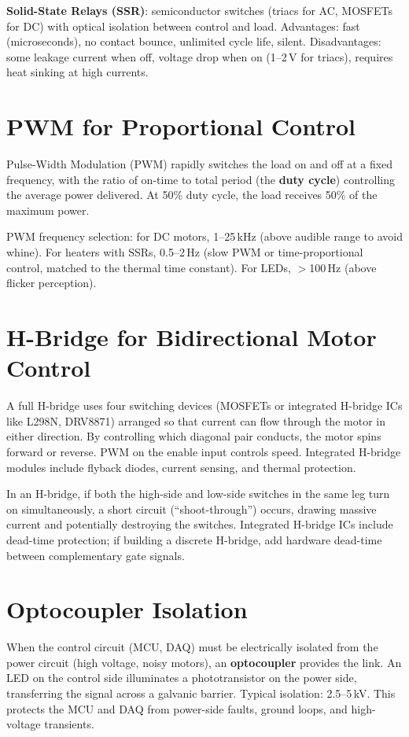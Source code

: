 \documentclass[11pt,letterpaper,twoside,openany]{book}
\begin{document}
\textbf{Solid-State Relays (SSR)}: semiconductor switches (triacs for AC, MOSFETs for DC) with optical isolation between control and load. Advantages: fast (microseconds), no contact bounce, unlimited cycle life, silent. Disadvantages: some leakage current when off, voltage drop when on (1--2\,V for triacs), requires heat sinking at high currents.

\section{PWM for Proportional Control}
Pulse-Width Modulation (PWM) rapidly switches the load on and off at a fixed frequency, with the ratio of on-time to total period (the \textbf{duty cycle}) controlling the average power delivered. At 50\% duty cycle, the load receives 50\% of the maximum power.

PWM frequency selection: for DC motors, 1--25\,kHz (above audible range to avoid whine). For heaters with SSRs, 0.5--2\,Hz (slow PWM or time-proportional control, matched to the thermal time constant). For LEDs, $>$100\,Hz (above flicker perception).

\section{H-Bridge for Bidirectional Motor Control}
A full H-bridge uses four switching devices (MOSFETs or integrated H-bridge ICs like L298N, DRV8871) arranged so that current can flow through the motor in either direction. By controlling which diagonal pair conducts, the motor spins forward or reverse. PWM on the enable input controls speed. Integrated H-bridge modules include flyback diodes, current sensing, and thermal protection.

\begin{warningbox}
In an H-bridge, if both the high-side and low-side switches in the same leg turn on simultaneously, a short circuit (``shoot-through'') occurs, drawing massive current and potentially destroying the switches. Integrated H-bridge ICs include dead-time protection; if building a discrete H-bridge, add hardware dead-time between complementary gate signals.
\end{warningbox}

\section{Optocoupler Isolation}
When the control circuit (MCU, DAQ) must be electrically isolated from the power circuit (high voltage, noisy motors), an \textbf{optocoupler} provides the link. An LED on the control side illuminates a phototransistor on the power side, transferring the signal across a galvanic barrier. Typical isolation: 2.5--5\,kV. This protects the MCU and DAQ from power-side faults, ground loops, and high-voltage transients.
\end{document}
